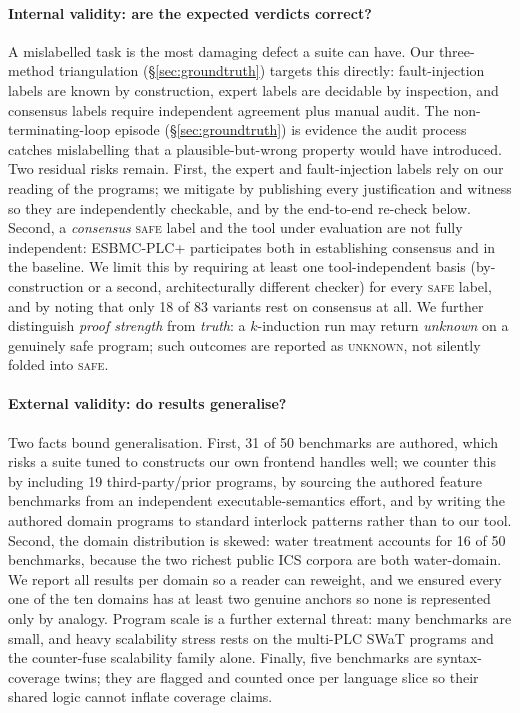 \paragraph{Internal validity: are the expected verdicts correct?}
A mislabelled task is the most damaging defect a suite can have. Our three-method
triangulation (\S\ref{sec:groundtruth}) targets this directly: fault-injection labels are
known by construction, expert labels are decidable by inspection, and consensus labels
require independent agreement plus manual audit. The non-terminating-loop episode
(\S\ref{sec:groundtruth}) is evidence the audit process catches mislabelling that a
plausible-but-wrong property would have introduced. Two residual risks remain. First,
the expert and fault-injection labels rely on our reading of the programs; we mitigate by
publishing every justification and witness so they are independently checkable, and by the
end-to-end re-check below. Second, a \emph{consensus} \textsc{safe} label and the
tool under evaluation are not fully independent: ESBMC-PLC+ participates both in
establishing consensus and in the baseline. We limit this by requiring at least one
tool-independent basis (by-construction or a second, architecturally different checker)
for every \textsc{safe} label, and by noting that only 18 of 83 variants rest on
consensus at all. We further distinguish \emph{proof strength} from \emph{truth}: a
$k$-induction run may return \emph{unknown} on a genuinely safe program; such outcomes are
reported as \textsc{unknown}, not silently folded into \textsc{safe}.

\paragraph{External validity: do results generalise?}
Two facts bound generalisation. First, 31 of 50 benchmarks are authored, which risks a
suite tuned to constructs our own frontend handles well; we counter this by including 19
third-party/prior programs, by sourcing the authored feature benchmarks from an
independent executable-semantics effort, and by writing the authored domain programs to
standard interlock patterns rather than to our tool. Second, the domain distribution is
skewed: water treatment accounts for 16 of 50 benchmarks, because the two richest public
ICS corpora are both water-domain. We report all results per domain so a reader can
reweight, and we ensured every one of the ten domains has at least two genuine anchors so
none is represented only by analogy. Program scale is a further external threat: many
benchmarks are small, and heavy scalability stress rests on the multi-PLC SWaT programs
and the counter-fuse scalability family alone. Finally, five benchmarks are
syntax-coverage twins; they are flagged and counted once per language slice so their shared
logic cannot inflate coverage claims.

